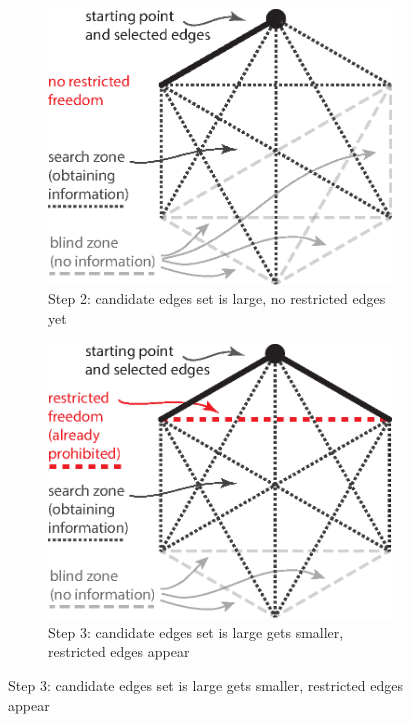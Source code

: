 \begin{figure}[th!]
  \centering
  \begin{subfigure}[b]{.48\textwidth}
      \includegraphics[width=\linewidth]{figures/ch_mst/mst_illustration_0}
      \caption{Step 2: candidate edges set is large, no restricted edges yet}
      \label{fig:ch_mst_illustration-0}
  \end{subfigure}
  \hfill
  \begin{subfigure}[b]{.48\textwidth}
      \includegraphics[width=\linewidth]{figures/ch_mst/mst_illustration_1}
      \caption{Step 3: candidate edges set is large gets smaller, restricted edges appear}

\end{subfigure}
\end{figure}
